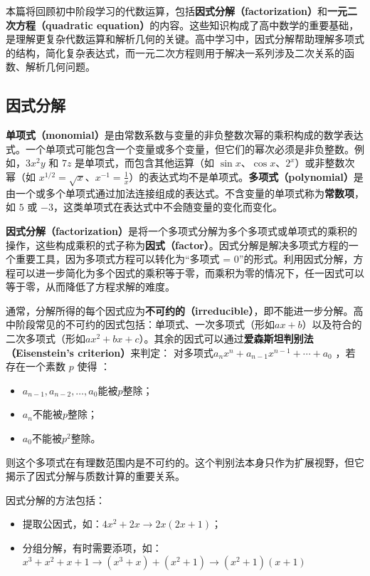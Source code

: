 
本篇将回顾初中阶段学习的代数运算，包括\textbf{因式分解（factorization）}和\textbf{一元二次方程（quadratic equation）}的内容。这些知识构成了高中数学的重要基础，是理解更复杂代数运算和解析几何的关键。高中学习中，因式分解帮助理解多项式的结构，简化复杂表达式，而一元二次方程则用于解决一系列涉及二次关系的函数、解析几何问题。

\subsection{因式分解}

\textbf{单项式（monomial）}是由常数系数与变量的非负整数次幂的乘积构成的数学表达式。一个单项式可能包含一个变量或多个变量，但它们的幂次必须是非负整数。例如，$3x^2y$ 和 $7z$ 是单项式，而包含其他运算（如 $\sin x$、$\cos x$、$2^x$）或非整数次幂（如 $\displaystyle x^{1/2} = \sqrt{x}$、$\displaystyle x^{-1} = \frac{1}{x}$）的表达式均不是单项式。\textbf{多项式（polynomial）}是由一个或多个单项式通过加法连接组成的表达式。不含变量的单项式称为\textbf{常数项}，如 $5$ 或 $-3$，这类单项式在表达式中不会随变量的变化而变化。

\textbf{因式分解（factorization）}是将一个多项式分解为多个多项式或单项式的乘积的操作，这些构成乘积的式子称为\textbf{因式（factor）}。因式分解是解决多项式方程的一个重要工具，因为多项式方程可以转化为“多项式 = 0”的形式。利用因式分解，方程可以进一步简化为多个因式的乘积等于零，而乘积为零的情况下，任一因式可以等于零，从而降低了方程求解的难度。

通常，分解所得的每个因式应为\textbf{不可约的（irreducible）}，即不能进一步分解。高中阶段常见的不可约的因式包括：单项式、一次多项式（形如$ax+b$）以及符合的二次多项式（形如$ax^2+bx+c$）。其余的因式可以通过\textbf{爱森斯坦判别法（Eisenstein's criterion）}来判定：
对多项式$a_n x^n + a_{n-1}x^{n-1} + \cdots + a_0$  ，若存在一个素数  $p$  使得 ：
\begin{itemize}
\item $a_{n-1},a_{n-2},\dots,a_0$能被$p$整除；
\item $a_n$不能被$p$整除；
\item $a_0$不能被$p^2$整除。
\end{itemize}
则这个多项式在有理数范围内是不可约的。这个判别法本身只作为扩展视野，但它揭示了因式分解与质数计算的重要关系。

因式分解的方法包括：
\begin{itemize}
\item 提取公因式，如：$4x^2+2x\to2x(2x+1)$；
\item 分组分解，有时需要添项，如：$ x^3 + x^2 + x + 1\to (x^3  + x) + (x^2+ 1)\to(x^2 + 1)(x + 1) $


\end{itemize}


